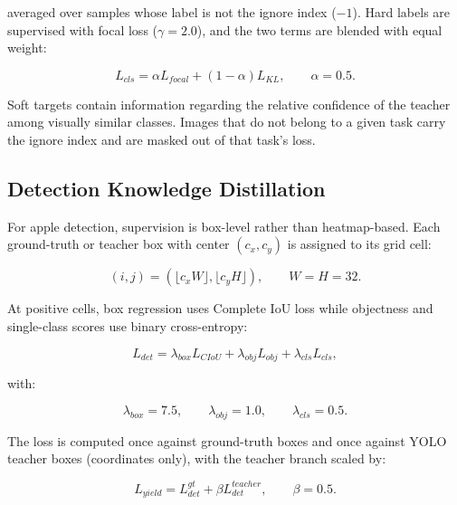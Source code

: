 \documentclass[preprint,12pt]{elsarticle}
\begin{document}
averaged over samples whose label is not the ignore index ($-1$).
Hard labels are supervised with focal loss ($\gamma=2.0$), and the two
terms are blended with equal weight:

\begin{equation}
L_{cls}
=
\alpha L_{focal}
+
(1-\alpha)L_{KL},
\qquad \alpha=0.5.
\end{equation}

Soft targets contain information regarding the relative confidence of the
teacher among visually similar classes. Images that do not belong to a
given task carry the ignore index and are masked out of that task's
loss.


\subsection{Detection Knowledge Distillation}

For apple detection, supervision is box-level rather than heatmap-based.
Each ground-truth or teacher box with center $(c_x,c_y)$ is assigned to
its grid cell:

\begin{equation}
(i,j)=
\left(
\lfloor c_x W \rfloor,
\lfloor c_y H \rfloor
\right),
\qquad W=H=32.
\end{equation}

At positive cells, box regression uses Complete IoU loss while
objectness and single-class scores use binary cross-entropy:

\begin{equation}
L_{det}
=
\lambda_{box}L_{CIoU}
+
\lambda_{obj}L_{obj}
+
\lambda_{cls}L_{cls},
\end{equation}

with:

\begin{equation}
\lambda_{box}=7.5,
\qquad
\lambda_{obj}=1.0,
\qquad
\lambda_{cls}=0.5.
\end{equation}

The loss is computed once against ground-truth boxes and once against
YOLO teacher boxes (coordinates only), with the teacher branch scaled
by:

\begin{equation}
L_{yield}
=
L_{det}^{gt}
+
\beta L_{det}^{teacher},
\qquad \beta=0.5.
\end{equation}
\end{document}
